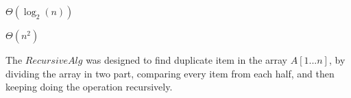 \begin{homeworkProblem}

\begin{homeworkSubProblem}[BackForwardAlg(n)]
$\Theta\left(\log_2(n)\right)$
\end{homeworkSubProblem}

\begin{homeworkSubProblem}[RecursiveAlg(n)]
$\Theta(n^2)$
\end{homeworkSubProblem}

\begin{homeworkSubProblem}
The $RecursiveAlg$ was designed to find duplicate item in the array $A[1...n]$,
by dividing the array in two part, comparing every item from each half, and
then keeping doing the operation recursively.
\end{homeworkSubProblem}

\end{homeworkProblem}
